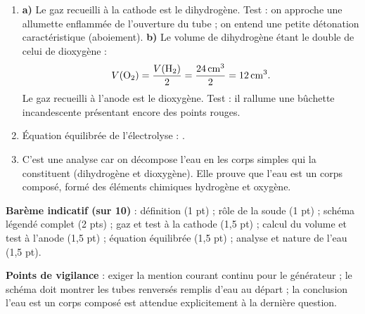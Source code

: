 \documentclass[11pt]{article}
\newcommand{\cle}[1]{{\popxbold\color{popdark}#1}}
\begin{document}
\begin{corrige}
\begin{enumerate}
\item \textbf{a)} Le gaz recueilli à la cathode est le \cle{dihydrogène}. Test : on approche une allumette enflammée de l'ouverture du tube ; on entend une petite détonation caractéristique (aboiement).
\textbf{b)} Le volume de dihydrogène étant le double de celui de dioxygène :
\[ V(\ce{O2}) = \frac{V(\ce{H2})}{2} = \frac{\SI{24}{cm^3}}{2} = \SI{12}{cm^3}. \]
Le gaz recueilli à l'anode est le \cle{dioxygène}. Test : il rallume une bûchette incandescente présentant encore des points rouges.
\item Équation équilibrée de l'électrolyse : .
\item C'est une \cle{analyse} car on décompose l'eau en les corps simples qui la constituent (dihydrogène et dioxygène). Elle prouve que l'eau est un \cle{corps composé}, formé des éléments chimiques hydrogène et oxygène.
\end{enumerate}
\textbf{Barème indicatif (sur 10)} : définition (1 pt) ; rôle de la soude (1 pt) ; schéma légendé complet (2 pts) ; gaz et test à la cathode (1,5 pt) ; calcul du volume et test à l'anode (1,5 pt) ; équation équilibrée (1,5 pt) ; analyse et nature de l'eau (1,5 pt).

\textbf{Points de vigilance} : exiger la mention \og courant continu \fg{} pour le générateur ; le schéma doit montrer les tubes renversés remplis d'eau au départ ; la conclusion \og l'eau est un corps composé \fg{} est attendue explicitement à la dernière question.
\end{corrige}
\end{document}
